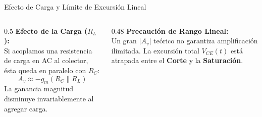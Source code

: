 \documentclass[aspectratio=169, table, xcdraw]{beamer}
\begin{document}
\begin{frame}{Efecto de Carga y Límite de Excursión Lineal}
    \begin{columns}
        \begin{column}{0.5\textwidth}
            \textbf{Efecto de la Carga ($R_L$):} \\
            Si acoplamos una resistencia de carga en AC al colector, ésta queda en paralelo con $R_C$:
            \begin{equation*}
                A_v \approx -g_m (R_C \parallel R_L)
            \end{equation*}
            La ganancia magnitud disminuye invariablemente al agregar carga.
        \end{column}
        \begin{column}{0.48\textwidth}
            \textbf{Precaución de Rango Lineal:} \\
            Un gran $|A_v|$ teórico no garantiza amplificación ilimitada. La excursión total $V_{CE}(t)$ está atrapada entre el \textbf{Corte} y la \textbf{Saturación}.
            \begin{center}
            \end{center}
        \end{column}
    \end{columns}
\end{frame}
\end{document}

